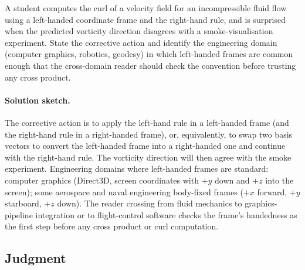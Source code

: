 \begin{exercise}
A student computes the curl of a velocity field for an
incompressible fluid flow using a left-handed coordinate frame and
the right-hand rule, and is surprised when the predicted vorticity
direction disagrees with a smoke-visualisation experiment. State
the corrective action and identify the engineering domain (computer
graphics, robotics, geodesy) in which left-handed frames are common
enough that the cross-domain reader should check the convention
before trusting any cross product.

\paragraph{Solution sketch.} The corrective action is to apply the
left-hand rule in a left-handed frame (and the right-hand rule in a
right-handed frame), or, equivalently, to swap two basis vectors to
convert the left-handed frame into a right-handed one and continue
with the right-hand rule. The vorticity direction will then agree
with the smoke experiment. Engineering domains where left-handed
frames are standard: computer graphics (Direct3D, screen
coordinates with $+y$ down and $+z$ into the screen); some aerospace
and naval engineering body-fixed frames ($+x$ forward, $+y$
starboard, $+z$ down). The reader crossing from fluid mechanics to
graphics-pipeline integration or to flight-control software checks
the frame's handedness as the first step before any cross product
or curl computation.
\end{exercise}

\subsection*{Judgment}

